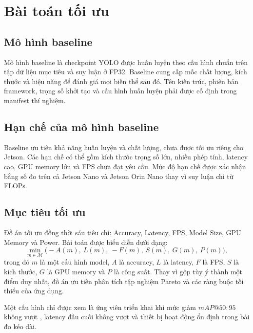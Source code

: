 \section{Bài toán tối ưu}

\subsection{Mô hình baseline}

Mô hình baseline là checkpoint YOLO được huấn luyện theo cấu hình chuẩn trên tập
dữ liệu mục tiêu và suy luận ở FP32. Baseline cung cấp mốc chất lượng, kích thước
và hiệu năng để đánh giá mọi biến thể sau đó. Tên kiến trúc, phiên bản framework,
trọng số khởi tạo và cấu hình huấn luyện phải được cố định trong manifest thí
nghiệm.

\subsection{Hạn chế của mô hình baseline}

Baseline ưu tiên khả năng huấn luyện và chất lượng, chưa được tối ưu riêng cho
Jetson. Các hạn chế có thể gồm kích thước trọng số lớn, nhiều phép tính, latency
cao, GPU memory lớn và FPS chưa đạt yêu cầu. Mức độ hạn chế được xác nhận bằng
số đo trên cả Jetson Nano và Jetson Orin Nano thay vì suy luận chỉ từ FLOPs.

\subsection{Mục tiêu tối ưu}

Đồ án tối ưu đồng thời sáu tiêu chí: Accuracy, Latency, FPS, Model Size, GPU
Memory và Power. Bài toán được biểu diễn dưới dạng:
\begin{equation}
  \min_{m\in\mathcal{M}}
  \bigl(-A(m),\ L(m),\ -F(m),\ S(m),\ G(m),\ P(m)\bigr),
\end{equation}
trong đó $m$ là một cấu hình model, $A$ là accuracy, $L$ là latency, $F$ là FPS,
$S$ là kích thước, $G$ là GPU memory và $P$ là công suất. Thay vì gộp tùy ý
thành một điểm duy nhất, đồ án ưu tiên phân tích tập nghiệm Pareto và các ràng
buộc tối thiểu của ứng dụng.

Một cấu hình chỉ được xem là ứng viên triển khai khi mức giảm $mAP@50{:}95$
không vượt , latency đầu cuối không vượt  và thiết bị hoạt động ổn định trong bài đo kéo dài.